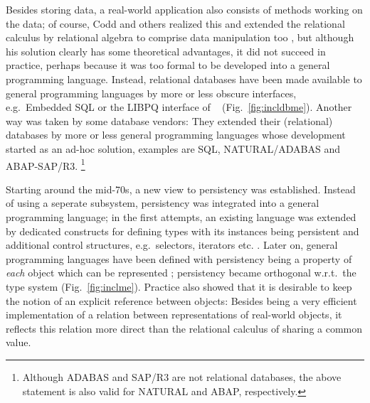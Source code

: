 \documentclass[a4paper%
]{article}
\newcommand\showfigrule{0pt}
\renewcommand\figurename{Fig.}
\begin{document}
\begin{figwindow}[2,r,{\rule{\showfigrule}{4\baselineskip}
                       \fbox{\psfig{figure=incldbme.eps}}},%
                  {Modelling a real system%
                   {$^{\ref{fn:fig}}$}\label{fig:incldbme}}]
%
\addtocounter{footnote}{1}%
%
Besides storing data, a real-world application also consists of
methods working on the data; of course, Codd and others realized this
and extended the relational calculus by relational algebra to comprise
data manipulation too \cite[]{bib:co79}
\cite[]{bib:on94}, but although his solution clearly has
some theoretical advantages, it did not succeed in practice, perhaps
because it was too formal to be developed into a general programming
language. Instead, relational databases have been made available to
general programming languages by more or less obscure interfaces,
e.g.\ Embedded SQL
\cite[]{bib:on94} or the LIBPQ interface of
\postgres\ \cite[]{bib:we93}
(\figurename~\ref{fig:incldbme}). Another way was taken
by some database vendors: They extended their (relational) databases
by more or less general programming languages whose development
started as an ad-hoc solution, examples are SQL, NATURAL/ADABAS and
ABAP-SAP/R3.%
\footnote{Although ADABAS and SAP/R3 are not
relational databases, the above statement is also valid for
NATURAL and ABAP, respectively.}
\end{figwindow}%
%
\begin{figwindow}[2,r,{\rule{\showfigrule}{2\baselineskip}%
                       \fbox{\psfig{figure=inclme.eps}}},%
                 {Modelling a real system%
                  {$^{\ref{fn:fig}}$}\label{fig:inclme}}]
%
Starting around the mid-70s, a new view to persistency was
established. Instead of using a seperate subsystem, persistency was
integrated into a general programming language; in the first attempts,
an existing language was extended by dedicated constructs for defining
types with its instances being persistent and additional control
structures, e.g.\ selectors, iterators etc. \cite{bib:schm80}. Later
on, general programming languages have been defined with persistency
being a property of \emph{each} object which can be represented
\cite{bib:cl91,bib:ma93}; persistency became orthogonal w.r.t.\ the
type system (\figurename~\ref{fig:inclme}). Practice also showed that
it is desirable to keep the notion of an explicit reference between
objects: Besides being a very efficient implementation of a relation
between representations of real-world objects, it reflects this
relation more direct than the relational calculus of sharing a common
value.
\end{figwindow}%
%
\end{document}
